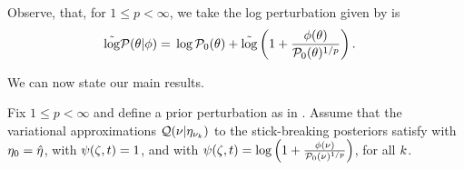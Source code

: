 Observe, that, for $1 \le p < \infty$, we take the log perturbation given by
 is
%
\begin{align*}
%
\logtrim \p(\theta \vert \phi) ={}&
    \log \pbase(\theta) +
        \logtrim\left(1 + \frac{\phi(\theta)}{\pbase(\theta)^{1/p}} \right).
%
\end{align*}
%


We can now state our main results.


\begin{thm}
%
Fix $1 \le p < \infty$ and define a prior perturbation as in
.
Assume that the variational approximations $\mathcal{Q}(\nu \vert \eta_{\nu_{k}})$ to the
stick-breaking posteriors satisfy  with $\eta_0 =
\hat\eta$, with $\psi(\zeta, t) = 1$, and with $\psi(\zeta, t) = \log\left(1 + \frac{\phi(\nu)}{\mathcal{P}_{0}(\nu)^{1/p}} \right)$, for all $k$.

%
\end{thm}
